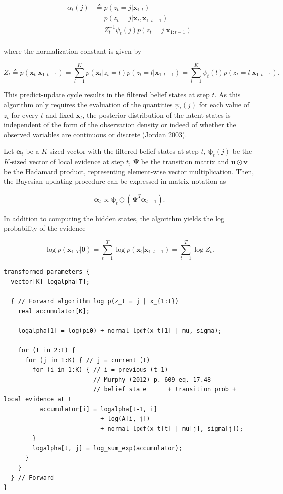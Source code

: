\documentclass[]{article}
\newcommand{\mat}[1]{\mathbf{#1}}
\begin{document}
\begin{align*}
\label{eq:filtered-beliefstate}
\alpha_t(j) 
  & \triangleq  p(z_t = j | \mat{x}_{1:t}) \\
  &= p(z_t = j | \mat{x}_{t}, \mat{x}_{1:t-1}) \\
  &= Z_t^{-1} \psi_t(j) p(z_t = j | \mat{x}_{1:t-1}) \\
\end{align*}

where the normalization constant is given by

\[
Z_t
  \triangleq  p(\mat{x}_t | \mat{x}_{1:t-1})
  = \sum_{l=1}^{K}{p(\mat{x}_{t} | z_t = l) p(z_t = l | \mat{x}_{1:t-1})}
  = \sum_{l=1}^{K}{\psi_t(l) p(z_t = l | \mat{x}_{1:t-1})}.
\]

This predict-update cycle results in the filtered belief states at step
\(t\). As this algorithm only requires the evaluation of the quantities
\(\psi_t(j)\) for each value of \(z_t\) for every \(t\) and fixed
\(\mat{x}_t\), the posterior distribution of the latent states is
independent of the form of the observation density or indeed of whether
the observed variables are continuous or discrete (Jordan 2003).

Let \(\mat{\alpha}_t\) be a \(K\)-sized vector with the filtered belief
states at step \(t\), \(\mat{\psi}_t(j)\) be the \(K\)-sized vector of
local evidence at step \(t\), \(\mat{\Psi}\) be the transition matrix
and \(\mat{u} \odot \mat{v}\) be the Hadamard product, representing
element-wise vector multiplication. Then, the Bayesian updating
procedure can be expressed in matrix notation as

\[
\mat{\alpha}_t \propto \mat{\psi}_t \odot (\mat{\Psi}^T \mat{\alpha}_{t-1}).
\]

In addition to computing the hidden states, the algorithm yields the log
probability of the evidence

\[
\log p(\mat{x}_{1:T} | \mat{\theta}) = \sum_{t=1}^{T}{\log p(\mat{x}_{t} | \mat{x}_{1:t-1})} = \sum_{t=1}^{T}{\log Z_t}.
\]

\begin{verbatim}
transformed parameters {
  vector[K] logalpha[T];

  { // Forward algorithm log p(z_t = j | x_{1:t})
    real accumulator[K];

    logalpha[1] = log(pi0) + normal_lpdf(x_t[1] | mu, sigma);

    for (t in 2:T) {
      for (j in 1:K) { // j = current (t)
        for (i in 1:K) { // i = previous (t-1)
                         // Murphy (2012) p. 609 eq. 17.48
                         // belief state      + transition prob + local evidence at t
          accumulator[i] = logalpha[t-1, i] 
                           + log(A[i, j]) 
                           + normal_lpdf(x_t[t] | mu[j], sigma[j]);
        }
        logalpha[t, j] = log_sum_exp(accumulator);
      }
    }
  } // Forward
}
\end{verbatim}
\end{document}
